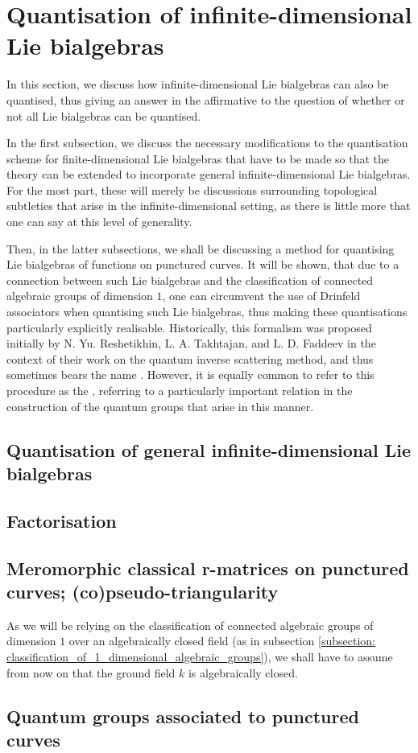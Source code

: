 \section{Quantisation of infinite-dimensional Lie bialgebras}
    In this section, we discuss how infinite-dimensional Lie bialgebras can also be quantised, thus giving an answer in the affirmative to the question of whether or not all Lie bialgebras can be quantised.
    
    In the first subsection, we discuss the necessary modifications to the quantisation scheme for finite-dimensional Lie bialgebras that have to be made so that the theory can be extended to incorporate general infinite-dimensional Lie bialgebras. For the most part, these will merely be discussions surrounding topological subtleties that arise in the infinite-dimensional setting, as there is little more that one can say at this level of generality.
    
    Then, in the latter subsections, we shall be discussing a method for quantising Lie bialgebras of functions on punctured curves. It will be shown, that due to a connection between such Lie bialgebras and the classification of connected algebraic groups of dimension $1$, one can circumvent the use of Drinfeld associators when quantising such Lie bialgebras, thus making these quantisations particularly explicitly realisable. Historically, this formalism was proposed initially by N. Yu. Reshetikhin, L. A. Takhtajan, and L. D. Faddeev in the context of their work on the quantum inverse scattering method, and thus sometimes bears the name . However, it is equally common to refer to this procedure as the , referring to a particularly important relation in the construction of the quantum groups that arise in this manner.

    \subsection{Quantisation of general infinite-dimensional Lie bialgebras}

    \subsection{Factorisation}

    \subsection{Meromorphic classical r-matrices on punctured curves; (co)pseudo-triangularity}
        \begin{convention}
            As we will be relying on the classification of connected algebraic groups of dimension $1$ over an algebraically closed field (as in subsection \ref{subsection: classification_of_1_dimensional_algebraic_groups}), we shall have to assume from now on that the ground field $k$ is algebraically closed. 
        \end{convention}

    \subsection{Quantum groups associated to punctured curves}